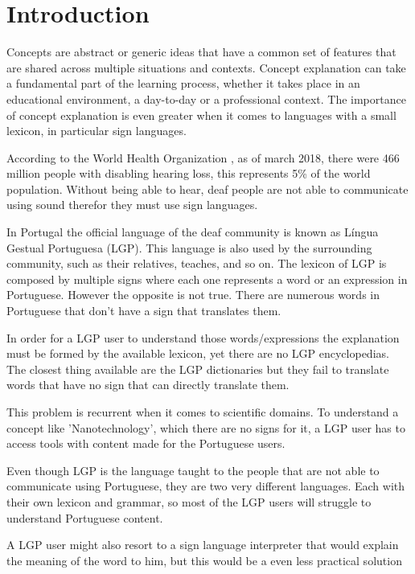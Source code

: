 \documentclass[runningheads]{llncs}
\begin{document}
\section{Introduction}

Concepts are abstract or generic ideas that have a common set of features that are shared across multiple situations and contexts.
Concept explanation can take a fundamental part of the learning process, whether it takes place in an educational environment, a day-to-day or a professional context.
The importance of concept explanation is even greater when it comes to languages with a small lexicon, in particular sign languages.

According to the World Health Organization \cite{who_2020}, as of march 2018, there were 466 million people with disabling hearing loss, this represents 5\% of the world population.
Without being able to hear, deaf people are not able to communicate using sound therefor they must use sign languages.

In Portugal the official language of the deaf community is known as Língua Gestual Portuguesa (LGP).
This language is also used by the surrounding community, such as their relatives, teaches, and so on.
The lexicon of LGP is composed by multiple signs where each one represents a word or an expression in Portuguese.
However the opposite is not true.
There are numerous words in Portuguese that don't have a sign that translates them.

In order for a LGP user to understand those words/expressions the explanation must be formed by the available lexicon, yet there are no LGP encyclopedias.
The closest thing available are the LGP dictionaries but they fail to translate words that have no sign that can directly translate them.

This problem is recurrent when it comes to scientific domains.
To understand a concept like 'Nanotechnology', which there are no signs for it, a LGP user has to access tools with content made for the Portuguese users.

Even though LGP is the language taught to the people that are not able to communicate using Portuguese, they are two very different languages.
Each with their own lexicon and grammar, so most of the LGP users will struggle to understand Portuguese content.

A LGP user might also resort to a sign language interpreter that would explain the meaning of the word to him, but this would be a even less practical solution
\end{document}
